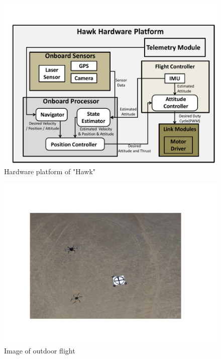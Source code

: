 \documentclass{standalone}
\begin{document}
\begin{figure}[h]
  \begin{center}
    \includegraphics[clip,  bb=0 0 720 500,  width=\columnwidth]{sections/task1/images/hawk-platform.pdf}
    \caption{Hardware platform of "Hawk"}
    \label{fig:task1-uav-platform}
  \end{center}
\end{figure} 

\begin{figure}[h]
  \begin{center}
    \includegraphics[clip,  bb=88 84 599 440,  width=\columnwidth]{sections/task1/images/task1-outdoor.pdf}
    \caption{Image of outdoor flight }
    \label{fig:task1-outdoor-flight}
  \end{center}
\end{figure} 
\end{document}
